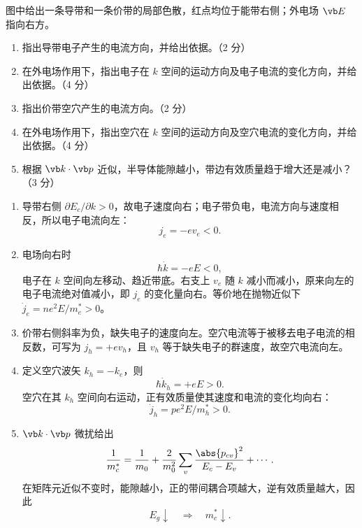 \begin{question}[15 分]
图中给出一条导带和一条价带的局部色散，红点均位于能带右侧；外电场 $\vb E$ 指向右方。
\begin{center}
\end{center}
\begin{enumerate}
  \item 指出导带电子产生的电流方向，并给出依据。（2 分）
  \item 在外电场作用下，指出电子在 $k$ 空间的运动方向及电子电流的变化方向，并给出依据。（4 分）
  \item 指出价带空穴产生的电流方向。（2 分）
  \item 在外电场作用下，指出空穴在 $k$ 空间的运动方向及空穴电流的变化方向，并给出依据。（4 分）
  \item 根据 $\vb k\cdot\vb p$ 近似，半导体能隙越小，带边有效质量趋于增大还是减小？（3 分）
\end{enumerate}


\begin{solution}
\begin{enumerate}
  \item 导带右侧 $\partial E_c/\partial k>0$，故电子速度向右；电子带负电，电流方向与速度相反，所以电子电流向左：
  \[
    j_e=-ev_e<0.
  \]
  \item 电场向右时
  \[
    \hbar\dot k=-eE<0,
  \]
  电子在 $k$ 空间向左移动、趋近带底。右支上 $v_e$ 随 $k$ 减小而减小，原来向左的电子电流绝对值减小，即 $j_e$ 的变化量向右。等价地在抛物近似下
  $\dot j_e=ne^2E/m_e^*>0$。
  \item 价带右侧斜率为负，缺失电子的速度向左。空穴电流等于被移去电子电流的相反数，可写为 $j_h=+ev_h$，且 $v_h$ 等于缺失电子的群速度，故空穴电流向左。
  \item 定义空穴波矢 $k_h=-k_e$，则
  \[
    \hbar\dot k_h=+eE>0.
  \]
  空穴在其 $k_h$ 空间向右运动，正有效质量使其速度和电流的变化均向右：
  \[
    \dot j_h=pe^2E/m_h^*>0.
  \]
  \item $\vb k\cdot\vb p$ 微扰给出
  \[
    \frac1{m_c^*}=\frac1{m_0}+\frac{2}{m_0^2}
    \sum_{v}\frac{\abs{p_{cv}}^2}{E_c-E_v}+\cdots.
  \]
  在矩阵元近似不变时，能隙越小，正的带间耦合项越大，逆有效质量越大，因此
  \[
    \boxed{E_g\downarrow\quad\Longrightarrow\quad m_c^*\downarrow.}
  \]
\end{enumerate}
\end{solution}
\end{question}

